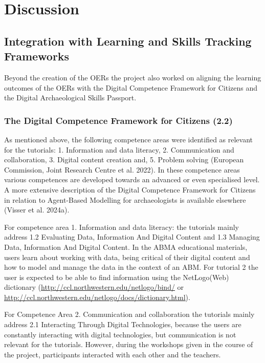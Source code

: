 \documentclass[
]{article}
\begin{document}
\hypertarget{discussion}{%
\section{Discussion}\label{discussion}}

\hypertarget{integration-with-learning-and-skills-tracking-frameworks}{%
\subsection{Integration with Learning and Skills Tracking Frameworks}\label{integration-with-learning-and-skills-tracking-frameworks}}

Beyond the creation of the OERs the project also worked on aligning the learning outcomes of the OERs with the Digital Competence Framework for Citizens and the Digital Archaeological Skills Passport.

\hypertarget{the-digital-competence-framework-for-citizens-2.2}{%
\subsubsection{The Digital Competence Framework for Citizens (2.2)}\label{the-digital-competence-framework-for-citizens-2.2}}

As mentioned above, the following competence areas were identified as relevant for the tutorials: 1. Information and data literacy, 2. Communication and collaboration, 3. Digital content creation and, 5. Problem solving (European Commission, Joint Research Centre et al. 2022). In these competence areas various competences are developed towards an advanced or even specialised level. A more extensive description of the Digital Competence Framework for Citizens in relation to Agent-Based Modelling for archaeologists is available elsewhere (Visser et al. 2024a).

For competence area 1. Information and data literacy: the tutorials mainly address 1.2 Evaluating Data, Information And Digital Content and 1.3 Managing Data, Information And Digital Content. In the ABMA educational materials, users learn about working with data, being critical of their digital content and how to model and manage the data in the context of an ABM. For tutorial 2 the user is expected to be able to find information using the NetLogo(Web) dictionary (\url{http://ccl.northwestern.edu/netlogo/bind/} or \url{http://ccl.northwestern.edu/netlogo/docs/dictionary.html}).

For Competence Area 2. Communication and collaboration the tutorials mainly address 2.1 Interacting Through Digital Technologies, because the users are constantly interacting with digital technologies, but communication is not relevant for the tutorials. However, during the workshops given in the course of the project, participants interacted with each other and the teachers.
\end{document}
